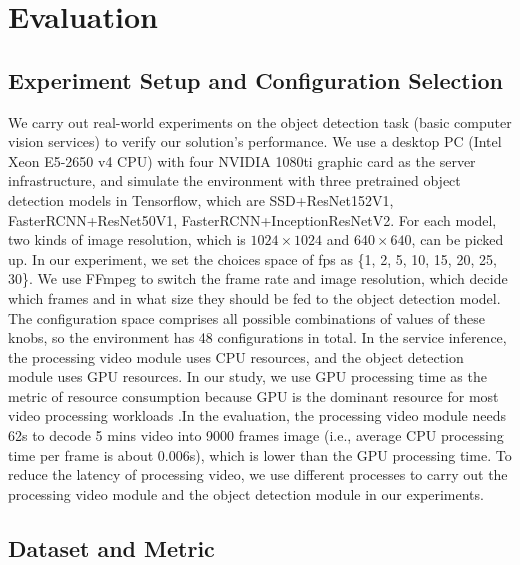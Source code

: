 \section{Evaluation}
\label{Section: experiment}

\subsection{Experiment Setup and Configuration Selection}
\label{subsec: configuration}
We carry out real-world experiments on the object detection task (basic computer vision services) to verify our solution’s performance. We use a desktop PC (Intel Xeon E5-2650 v4 CPU) with four NVIDIA 1080ti graphic card as the server infrastructure, and simulate the environment \cite{trade-offs} with three pretrained object detection models in Tensorflow, which are SSD+ResNet152V1, FasterRCNN+ResNet50V1, FasterRCNN+InceptionResNetV2. For each model, two kinds of image resolution, which is $1024\times1024$ and $640\times640$, can be picked up. In our experiment, we set the choices space of fps as \{1, 2, 5, 10, 15, 20, 25, 30\}. We use FFmpeg \cite{ffmpeg} to switch the frame rate and image resolution, which decide which frames and in what size they should be fed to the object detection model. The configuration space comprises all possible combinations of values of these knobs, so the environment has 48 configurations in total. In the service inference, the processing video module uses CPU resources, and the object detection module uses GPU resources. In our study, we use GPU processing time as the metric of resource consumption because GPU is the dominant resource for most video processing workloads \cite{jiang2018chameleon}.In the evaluation, the processing video module needs 62s to decode 5 mins video into 9000 frames image (i.e., average CPU processing time per frame is about 0.006s), which is lower than the GPU processing time. To reduce the latency of processing video, we use different processes to carry out the processing video module and the object detection module in our experiments.   

\subsection{Dataset and Metric}
\label{subsec: datasets}

